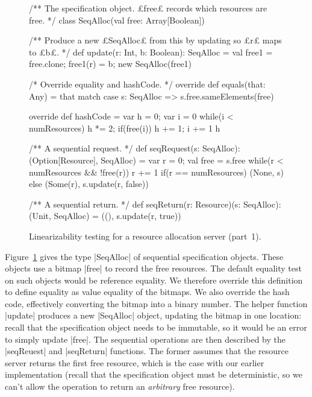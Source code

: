 \begin{figure}
\begin{scala}
  /** The specification object.  £free£ records which resources are free. */
  class SeqAlloc(val free: Array[Boolean]){
    /** Produce a new £SeqAlloc£ from this by updating so £r£ maps to £b£. */
    def update(r: Int, b: Boolean): SeqAlloc = {
      val free1 = free.clone; free1(r) = b; new SeqAlloc(free1)
    }

    /* Override equality and hashCode. */
    override def equals(that: Any) = that match{
      case s: SeqAlloc => s.free.sameElements(free)
    }

    override def hashCode = {
      var h = 0; var i = 0
      while(i < numResources){ h *= 2; if(free(i)) h += 1; i += 1 }
      h
    }
  }

  /** A sequential request. */
  def seqRequest(s: SeqAlloc): (Option[Resource], SeqAlloc) = {
    var r = 0; val free = s.free
    while(r < numResources && !free(r)) r += 1
    if(r == numResources) (None, s) else (Some(r), s.update(r, false))
  }

  /** A sequential return. */
  def seqReturn(r: Resource)(s: SeqAlloc): (Unit, SeqAlloc) = 
    ((), s.update(r, true))
\end{scala}
\caption{Linearizability testing for a resource allocation server (part~1).}
\label{fig:RALinTest-1}
\end{figure}


Figure~\ref{fig:RALinTest-1} gives the type |SeqAlloc| of sequential
specification objects.  These objects use a bitmap |free| to record the free
resources.  The default equality test on such objects would be reference
equality.  We therefore override this definition to define equality as value
equality of the bitmaps.  We also override the hash code, effectively
converting the bitmap into a binary number.  
%
The helper function |update| produces a new |SeqAlloc| object, updating the
bitmap in one location: recall that the specification object needs to be
immutable, so it would be an error to simply update |free|.  
%
The sequential operations are then described by the |seqReuest| and
|seqReturn| functions.  The former assumes that the resource server returns
the first free resource, which is the case with our earlier implementation
(recall that the specification object must be deterministic, so we can't allow
the operation to return an \emph{arbitrary} free resource). 


